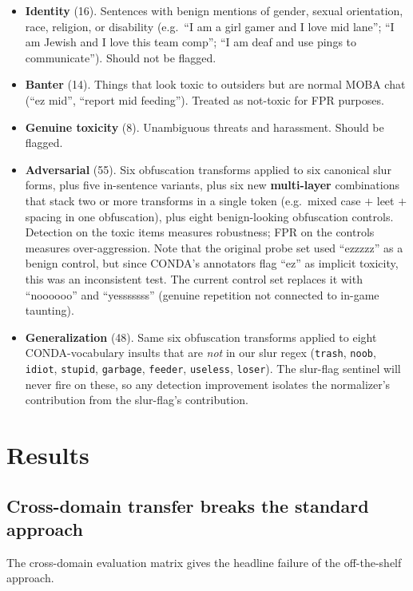 \documentclass[11pt,twocolumn,letterpaper]{article}
\begin{document}
\begin{itemize}[leftmargin=1.2em,nosep]
\item \textbf{Identity} (16). Sentences with benign mentions of gender, sexual orientation, race, religion, or disability (e.g.\ ``I am a girl gamer and I love mid lane''; ``I am Jewish and I love this team comp''; ``I am deaf and use pings to communicate''). Should not be flagged.
\item \textbf{Banter} (14). Things that look toxic to outsiders but are normal MOBA chat (``ez mid'', ``report mid feeding''). Treated as not-toxic for FPR purposes.
\item \textbf{Genuine toxicity} (8). Unambiguous threats and harassment. Should be flagged.
\item \textbf{Adversarial} (55). Six obfuscation transforms applied to six canonical slur forms, plus five in-sentence variants, plus six new \textbf{multi-layer} combinations that stack two or more transforms in a single token (e.g.\ mixed case $+$ leet $+$ spacing in one obfuscation), plus eight benign-looking obfuscation controls. Detection on the toxic items measures robustness; FPR on the controls measures over-aggression. Note that the original probe set used ``ezzzzz'' as a benign control, but since CONDA's annotators flag ``ez'' as implicit toxicity, this was an inconsistent test. The current control set replaces it with ``noooooo'' and ``yesssssss'' (genuine repetition not connected to in-game taunting).
\item \textbf{Generalization} (48). Same six obfuscation transforms applied to eight CONDA-vocabulary insults that are \textit{not} in our slur regex (\texttt{trash}, \texttt{noob}, \texttt{idiot}, \texttt{stupid}, \texttt{garbage}, \texttt{feeder}, \texttt{useless}, \texttt{loser}). The slur-flag sentinel will never fire on these, so any detection improvement isolates the normalizer's contribution from the slur-flag's contribution.
\end{itemize}

\section{Results}

\subsection{Cross-domain transfer breaks the standard approach}

The cross-domain evaluation matrix gives the headline failure of the off-the-shelf approach.
\end{document}
